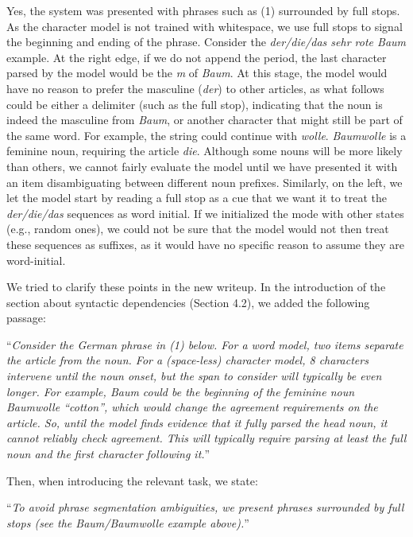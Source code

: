 \documentclass{article}[11pt,a4paper,oneside]
\begin{document}
Yes, the system was presented with phrases such as (1) surrounded by full stops. As the character model is not trained with whitespace, we use full stops to signal the beginning and ending of the phrase. Consider the \textit{der/die/das sehr rote Baum} example. At the right edge, if we do not append the period, the last character parsed by the model would be the \textit{m} of \textit{Baum}. At this stage, the model would have no reason to prefer the masculine (\textit{der}) to other articles, as what follows could be either a delimiter (such as the full stop), indicating that the noun is indeed the masculine from \textit{Baum}, or another character that might still be part of the same word. For example, the string could continue with \textit{wolle}. \textit{Baumwolle} is a feminine noun, requiring the article \textit{die}. Although some nouns will be more likely than others, we cannot fairly evaluate the model until we have presented it with an item disambiguating between different noun prefixes. Similarly, on the left, we let the model start by reading a full stop as a cue that we want it to treat the \textit{der/die/das} sequences as word initial. If we initialized the mode with other states (e.g., random ones), we could not be sure that the model would not then treat these sequences as suffixes, as it would have no specific reason to assume they are word-initial.

We tried to clarify these points in the new writeup. In the introduction of the section about syntactic dependencies (Section 4.2), we added the following passage:

``\textit{Consider the German phrase in (1) below. For a word model, two items separate the article from the noun. For a (space-less) character model, 8 characters intervene until the noun onset, but the span to consider will typically be even longer. For example, \emph{Baum} could be the beginning of the feminine noun \emph{Baumwolle} ``cotton'', which would change the agreement requirements on the article. So, until the model finds evidence that it fully parsed the head noun, it cannot reliably check agreement. This will typically require parsing at least the full noun and the first character following it.}''

Then, when introducing the relevant task, we state:

``\textit{To avoid phrase segmentation ambiguities, we present phrases surrounded by full stops (see the \emph{Baum}/\emph{Baumwolle} example above).}''
\newline
\end{document}
